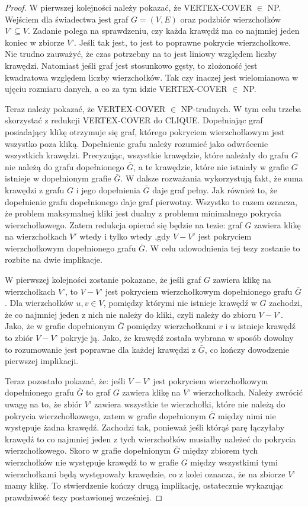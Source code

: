 \begin{proof}

W pierwszej kolejności należy pokazać, że VERTEX-COVER $\in$ NP. Wejściem dla świadectwa jest graf $G=(V,E)$ oraz podzbiór wierzchołków $V’ \subseteq V$. Zadanie polega na sprawdzeniu, czy każda krawędź ma co najmniej jeden koniec w zbiorze $V’$. Jeśli tak jest, to jest to poprawne pokrycie wierzchołkowe. Nie trudno zauważyć, że czas potrzebny na to jest liniowy względem liczby krawędzi. Natomiast jeśli graf jest stosunkowo gęsty, to złożoność jest kwadratowa względem liczby wierzchołków. Tak czy inaczej jest wielomianowa w ujęciu rozmiaru danych, a co za tym idzie VERTEX-COVER $\in$ NP.

Teraz należy pokazać, że VERTEX-COVER $\in$ NP-trudnych. W tym celu trzeba skorzystać z redukcji VERTEX-COVER do CLIQUE. Dopełniając graf posiadający klikę otrzymuje się graf, którego pokryciem wierzchołkowym jest wszystko poza kliką. Dopełnienie grafu należy rozumieć jako odwrócenie wszystkich krawędzi. Precyzując, wszystkie krawędzie, które należały do grafu $G$ nie należą do grafu dopełnionego $\bar{G}$, a te krawędzie, które nie istniały w grafie $G$ istnieje w dopełnionym grafie $\bar{G}$. W dalsze rozważania wykorzystują fakt, że suma krawędzi z grafu $G$ i jego dopełnienia $\bar{G}$ daje graf pełny. Jak również to, że dopełnienie grafu dopełnionego daje graf pierwotny. Wszystko to razem oznacza, że problem maksymalnej kliki jest dualny z problemu minimalnego pokrycia wierzchołkowego. Zatem redukcja opierać się będzie na tezie: graf $G$ zawiera klikę na wierzchołkach $V'$ wtedy i tylko wtedy ,gdy $V-V'$ jest pokryciem wierzchołkowym dopełnionego grafu $\bar{G}$. W celu udowodnienia tej tezy zostanie to rozbite na dwie implikacje.

W pierwszej kolejności zostanie pokazane, że jeśli graf $G$ zawiera klikę na wierzchołkach $V’$, to $V-V’$ jest pokryciem wierzchołkowym dopełnionego grafu $\bar{G}$. Dla wierzchołków $ u,v \in V$, pomiędzy którymi nie istnieje krawędź w $G$ zachodzi, że co najmniej jeden z nich nie należy do kliki, czyli należy do zbioru $V-V’$. Jako, że w grafie dopełnionym $\bar{G}$ pomiędzy wierzchołkami $v$ i $u$ istnieje krawędź to zbiór $V-V’$ pokryje ją. Jako, że krawędź została wybrana w sposób dowolny to rozumowanie jest poprawne dla każdej krawędzi z $\bar{G}$, co kończy dowodzenie pierwszej implikacji.

Teraz pozostało pokazać, że: jeśli $V-V’$ jest pokryciem wierzchołkowym dopełnionego grafu $\bar{G}$ to graf $G$ zawiera klikę na $V’$ wierzchołkach. Należy zwrócić uwagę na to, że zbiór $V’$ zawiera wszystkie te wierzchołki, które nie należą do pokrycia wierzchołkowego, zatem w grafie dopełnionym $\bar{G}$ między nimi nie występuje żadna krawędź. Zachodzi tak, ponieważ jeśli którąś parę łączyłaby krawędź to co najmniej jeden z tych wierzchołków musiałby należeć  do pokrycia wierzchołkowego. Skoro w grafie dopełnionym $\bar{G}$ między zbiorem tych wierzchołków nie występuje krawędź to w grafie $G$ między wszystkimi tymi wierzchołkami będą występowały krawędzie, co z kolei oznacza, że na zbiorze $V’$ mamy klikę. To stwierdzenie kończy drugą implikację, ostatecznie wykazując prawdziwość tezy postawionej wcześniej.


\end{proof}
